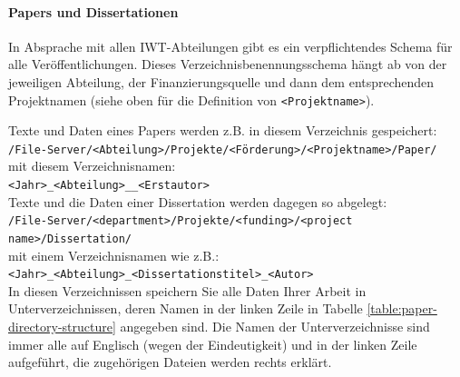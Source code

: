\paragraph{Papers und Dissertationen}

\noindent In Absprache mit allen IWT-Abteilungen gibt es ein verpflichtendes Schema für alle Veröffentlichungen. Dieses Verzeichnisbenennungsschema hängt ab von der jeweiligen Abteilung, der Finanzierungsquelle und dann dem entsprechenden Projektnamen (siehe oben für die Definition von \texttt{<Projektname>}).

\begin{table}[H]
 
  \caption{%
  Die Daten jeder Arbeit müssen in acht Unterverzeichnissen gespeichert werden;
  weitere Hinweise: \\
  **Wenn die Arbeit druckreif ist, lädt der korrespondierende Autor die letzte
  und überarbeitete Version (d.h. nur die tatsächlich verwendeten, aber absolut
  vollständigen Daten) in das geschützte Verzeichnis \\
  ***Wenn die in einer Abbildung/Tabelle wiedergegebenen Daten aus verteilten
  Primärdatenverzeichnissen stammen, genügt es, hier nur das erzeugende Programm
  zu speichern%
  }
\label{table:paper-directory-structure}
\end{table}

\noindent Texte und Daten eines Papers werden z.B. in diesem Verzeichnis gespeichert:\\
\texttt{/File-Server/<Abteilung>/Projekte/<Förderung>/<Projektname>/Paper/} \\
mit diesem Verzeichnisnamen:
\\
\texttt{<Jahr>\_<Abteilung>\_<Paper-Name>\_<Erstautor> } \\


Texte und die Daten einer Dissertation werden dagegen so
abgelegt:
\\
\texttt{/File-Server/<department>/Projekte/<funding>/<project name>/Dissertation/} \\
mit einem Verzeichnisnamen wie z.B.:
\\
\texttt{<Jahr>\_<Abteilung>\_<Dissertationstitel>\_<Autor>} \\
In diesen Verzeichnissen speichern Sie alle Daten Ihrer Arbeit in
Unterverzeichnissen, deren Namen in der linken Zeile in
Tabelle \ref{table:paper-directory-structure} angegeben sind. Die Namen
der Unterverzeichnisse sind immer alle auf Englisch (wegen der Eindeutigkeit)
und in der linken Zeile aufgeführt, die zugehörigen Dateien werden rechts
erklärt.

